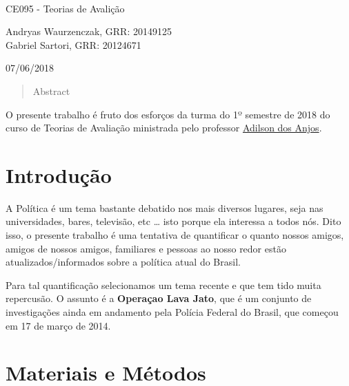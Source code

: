 \documentclass[]{article}
\title{}
\author{}
\date{}
\begin{document}
\begin{titlepage}
\\

\vspace{7.5cm}


\vspace{3cm}

CE095 - Teorias de Avalição

\vspace{2cm}

Andryas Waurzenczak, GRR: 20149125 \\
Gabriel Sartori, GRR: 20124671


\vfill

07/06/2018
\end{titlepage}


\begin{abstract}
Abstract
\end{abstract}


\pagebreak
\tableofcontents
\pagebreak

O presente trabalho é fruto dos esforços da turma do 1º semestre de 2018
do curso de Teorias de Avaliação ministrada pelo professor
\href{}{Adilson dos Anjos}.

\section{Introdução}\label{introducao}

A Política é um tema bastante debatido nos mais diversos lugares, seja
nas universidades, bares, televisão, etc \ldots{} isto porque ela
interessa a todos nós. Dito isso, o presente trabalho é uma tentativa de
quantificar o quanto nossos amigos, amigos de nossos amigos, familiares
e pessoas ao nosso redor estão atualizados/informados sobre a política
atual do Brasil.

Para tal quantificação selecionamos um tema recente e que tem tido muita
repercusão. O assunto é a \textbf{Operaçao Lava Jato}, que é um conjunto
de investigações ainda em andamento pela Polícia Federal do Brasil, que
começou em 17 de março de 2014.

\section{Materiais e Métodos}\label{materiais-e-metodos}
\end{document}
